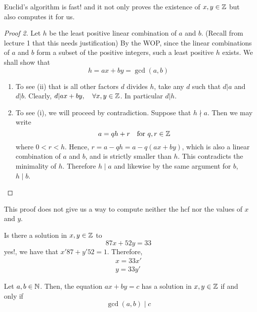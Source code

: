 \documentclass{article}
\begin{document}
\begin{remark}
    Euclid's algorithm is fast! and it not only proves the existence of $x, y \in \mathbb{Z}$ but also computes it for us.
\end{remark}

\begin{proof}[Proof 2]
    Let $h$ be the least positive linear combination of $a$ and $b$. (Recall from lecture 1 that this needs justification) By the WOP, since the linear combinations of $a$ and $b$ form a subset of the positive integers, such a least positive $h$ exists.
    We shall show that
    \[
        h = ax + by = \gcd(a, b)  
    \]
    \begin{enumerate}[cases]
        \item To see (ii) that is all other factors $d$ divides $h$, take any $d$ such that $d | a$ and $d | b$. Clearly, $d | ax + by, \quad \forall x, y \in \mathbb{Z}$. In particular $d | h$.
        \item To see (i), we will proceed by contradiction. Suppose that $h \nmid a$. Then we may write
        \[
            a = qh + r \quad \text{for} \ q, r \in \mathbb{Z}  
        \]
        where $0 < r < h$. Hence, $r = a - qh = a - q(ax + by)$, which is also a linear combination of $a$ and $b$, and is strictly smaller than $h$. This contradicts the minimality of $h$. \contradiction
        Therefore $h \mid a$ and likewise by the same argument for $b$, $h \mid b$.
    \end{enumerate}
\end{proof}

\begin{remark}
    This proof does not give us a way to compute neither the hcf nor the values of $x$ and $y$.
\end{remark}

\begin{question}
    Is there a solution in $x, y \in \mathbb{Z}$ to
    \[
        87x + 52y = 33  
    \]
    yes!, we have that $x'87 + y'52 = 1$. Therefore,
    \begin{align*}
        x = 33x' \\
        y = 33y'
    \end{align*}
\end{question}

\begin{nthm}
    Let $a, b \in \mathbb{N}$. Then, the equation $ax + by = c$ has a solution in $x, y \in \mathbb{Z}$ if and only if\
    \[
        \gcd(a, b) \mid c  
    \]
\end{nthm}
\end{document}
